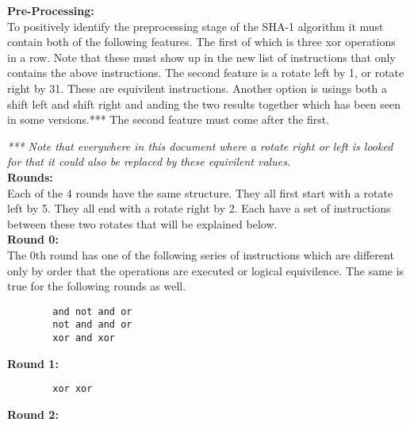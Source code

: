 \documentclass{article}
\begin{document}
    \textbf{Pre-Processing:}\\

    To positively identify the preprocessing stage of the SHA-1 algorithm it
    must contain both of the following features. The first of which is three
    xor operations in a row. Note that these must show up in the new list of
    instructions that only contains the above instructions. The second feature 
    is a rotate left by 1, or rotate right by 31. These are equivilent 
    instructions. Another option is usings both a shift left and shift right
    and anding the two results together which has been seen in some versions.***
    The second feature must come after the first.

\emph{*** Note that everywhere in this document where a rotate right or left is 
looked for that it could also be replaced by these equivilent values.} \\

    \textbf{Rounds:}\\

    Each of the 4 rounds have the same structure. They all first start with a
    rotate left by 5. They all end with a rotate right by 2. Each have a set
    of instructions between these two rotates that will be explained below.\\

    \textbf{Round 0:}\\
   
    The 0th round has one of the following series of instructions which are 
    different only by order that the operations are executed or logical 
    equivilence. The same is true for the following rounds as well.\\
\begin{algorithm}
\lstset{language=[mips]Assembler}
\begin{lstlisting}
        and not and or
        not and and or
        xor and xor
\end{lstlisting}
\end{algorithm}

    \textbf{Round 1:}\\

\begin{algorithm}
\lstset{language=[mips]Assembler}
\begin{lstlisting}
        xor xor
\end{lstlisting}
\end{algorithm}

    \textbf{Round 2:}\\
\end{document}
